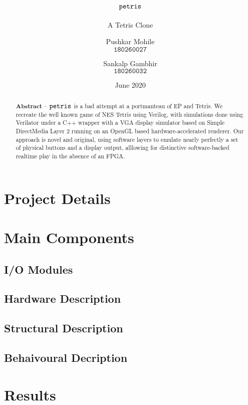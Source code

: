 \documentclass[10pt, a4paper, egregdoesnotlikesansseriftitles]{scrartcl}
\title{$\texttt{petris}$}
\subtitle{A Tetris Clone}
\author{
    Pushkar Mohile \\
    $\texttt{180260027}$
    \and
    Sankalp Gambhir \\
    $\texttt{180260032}$
    }
\date{June 2020}
\begin{document}
\maketitle

\begin{abstract}
    \centering
    $\textbf{Abstract --}$
    $\texttt{petris}$ is a bad attempt at a portmanteau of 
    EP and Tetris. We recreate the well known game of NES Tetris \cite{tetris}
    using Verilog, with simulations done using Verilator \cite{verilator} under
    a C++ wrapper with a VGA display simulator based on Simple DirectMedia Layer 2
    \cite{sdl2} running on an OpenGL based hardware-accelerated renderer. Our approach
    is novel and original, using software layers to emulate nearly perfectly a set of
    physical buttons and a display output, alllowing for distinctive software-backed
    realtime play in the absence of an FPGA.

\end{abstract}

  
\section{Project Details}


\section{Main Components}
\subsection{I/O Modules}

\subsection{Hardware Description}
\subsection{Structural Description }
\subsection{Behaivoural Decription}


\section{Results}

\end{document}
